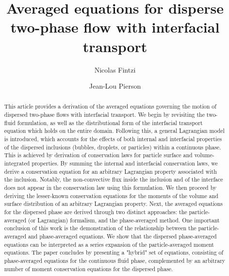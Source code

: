 \documentclass[11pt]{My_preprint}
\title{Averaged equations for disperse two-phase flow with interfacial transport}
\author[1,2]{Nicolas Fintzi}
\author[1]{Jean-Lou Pierson}
\affil[1]{IFP Energies Nouvelles, Rond-point de l'echangeur de Solaize, 69360 Solaize}
\affil[2]{Sorbonne Universit\'e, Institut Jean le Rond $\partial$'Alembert, 4 place Jussieu, 75252 PARIS CEDEX 05, France}
\begin{document}
\maketitle

\begin{abstract}
This article provides a derivation of the averaged equations governing the motion of dispersed two-phase flows with interfacial transport. 
We begin by revisiting the two-fluid formulation, as well as the distributional form of the interfacial transport equation which holds on the entire domain. 
Following this, a general Lagrangian model is introduced, which accounts for the effects of both internal and interfacial properties of the dispersed inclusions (bubbles, droplets, or particles) within a continuous phase.
This is achieved by derivation of conservation laws for particle surface and volume-integrated properties. 
By summing the internal and interfacial conservation laws, we derive a conservation equation for an arbitrary Lagrangian property associated with the inclusion. 
Notably, the non-convective flux inside the inclusion and of the interface does not appear in the conservation law using this formulation. 
We then proceed by deriving the lesser-known conservation equations for the moments of the volume and surface distribution of an arbitrary Lagrangian property.  
Next, the averaged equations for the dispersed phase are derived through two distinct approaches: the particle-averaged (or Lagrangian) formalism, and the phase-averaged method. 
One important conclusion of this work is the demonstration of the relationship between the particle-averaged and phase-averaged equations. 
We show that the dispersed phase-averaged equations can be interpreted as a series expansion of the particle-averaged moment equations. 
The paper concludes by presenting a "hybrid" set of equations, consisting of phase-averaged equations for the continuous fluid phase, complemented by an arbitrary number of moment conservation equations for the dispersed phase.
\end{abstract}












\end{document}
